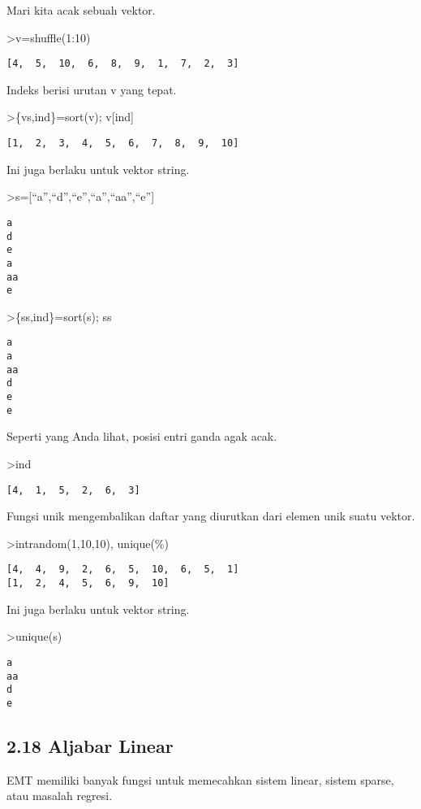 \documentclass[
]{book}
\begin{document}
Mari kita acak sebuah vektor.

\textgreater v=shuffle(1:10)

\begin{verbatim}
[4,  5,  10,  6,  8,  9,  1,  7,  2,  3]
\end{verbatim}

Indeks berisi urutan v yang tepat.

\textgreater\{vs,ind\}=sort(v); v{[}ind{]}

\begin{verbatim}
[1,  2,  3,  4,  5,  6,  7,  8,  9,  10]
\end{verbatim}

Ini juga berlaku untuk vektor string.

\textgreater s={[}``a'',``d'',``e'',``a'',``aa'',``e''{]}

\begin{verbatim}
a
d
e
a
aa
e
\end{verbatim}

\textgreater\{ss,ind\}=sort(s); ss

\begin{verbatim}
a
a
aa
d
e
e
\end{verbatim}

Seperti yang Anda lihat, posisi entri ganda agak acak.

\textgreater ind

\begin{verbatim}
[4,  1,  5,  2,  6,  3]
\end{verbatim}

Fungsi unik mengembalikan daftar yang diurutkan dari elemen unik suatu vektor.

\textgreater intrandom(1,10,10), unique(\%)

\begin{verbatim}
[4,  4,  9,  2,  6,  5,  10,  6,  5,  1]
[1,  2,  4,  5,  6,  9,  10]
\end{verbatim}

Ini juga berlaku untuk vektor string.

\textgreater unique(s)

\begin{verbatim}
a
aa
d
e
\end{verbatim}

\subsection{2.18 Aljabar Linear}\label{aljabar-linear}

EMT memiliki banyak fungsi untuk memecahkan sistem linear, sistem sparse, atau masalah regresi.
\end{document}
